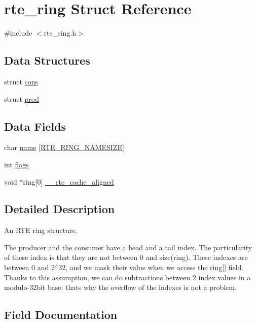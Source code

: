 \hypertarget{structrte__ring}{}\section{rte\+\_\+ring Struct Reference}
\label{structrte__ring}


{\ttfamily \#include $<$rte\+\_\+ring.\+h$>$}

\subsection*{Data Structures}
\begin{DoxyCompactItemize}
\item 
struct \hyperlink{structrte__ring_1_1cons}{cons}
\item 
struct \hyperlink{structrte__ring_1_1prod}{prod}
\end{DoxyCompactItemize}
\subsection*{Data Fields}
\begin{DoxyCompactItemize}
\item 
char \hyperlink{structrte__ring_a25143ba33a51e2c04774a1ca0a75af59}{name} \mbox{[}\hyperlink{rte__ring_8h_a2e508ee16359c5851fed8ff7a24cca01}{R\+T\+E\+\_\+\+R\+I\+N\+G\+\_\+\+N\+A\+M\+E\+S\+I\+Z\+E}\mbox{]}
\item 
int \hyperlink{structrte__ring_ac8bf36fe0577cba66bccda3a6f7e80a4}{flags}
\item 
void $\ast$ring\mbox{[}0\mbox{]} \hyperlink{structrte__ring_ab3cabbb2d7c187c328e92a1293086010}{\+\_\+\+\_\+rte\+\_\+cache\+\_\+aligned}
\end{DoxyCompactItemize}


\subsection{Detailed Description}
An R\+T\+E ring structure.

The producer and the consumer have a head and a tail index. The particularity of these index is that they are not between 0 and size(ring). These indexes are between 0 and 2$^\wedge$32, and we mask their value when we access the ring\mbox{[}\mbox{]} field. Thanks to this assumption, we can do subtractions between 2 index values in a modulo-\/32bit base\+: that\textquotesingle{}s why the overflow of the indexes is not a problem. 

\subsection{Field Documentation}
\hypertarget{structrte__ring_ab3cabbb2d7c187c328e92a1293086010}{}
